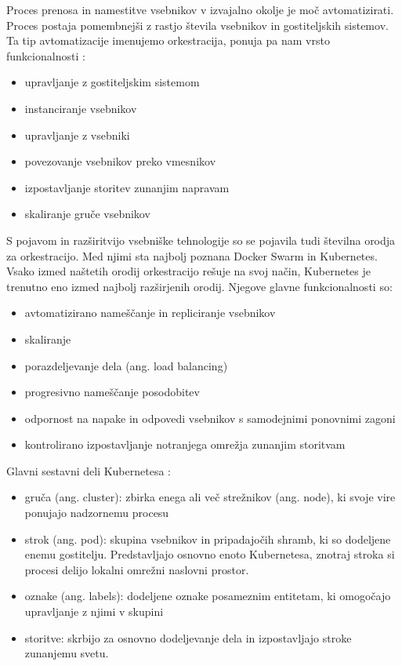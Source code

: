 \documentclass[a4paper, 12pt]{book}
\begin{document}
Proces prenosa in namestitve vsebnikov v izvajalno okolje je moč avtomatizirati.
Proces postaja pomembnejši z rastjo števila vsebnikov in gostiteljskih sistemov. 
Ta tip avtomatizacije imenujemo orkestracija, ponuja pa nam vrsto funkcionalnosti \cite{mongoKubernetes}:
\begin{itemize}
	\item upravljanje z gostiteljskim sistemom
	\item instanciranje vsebnikov
	\item upravljanje z vsebniki
	\item povezovanje vsebnikov preko vmesnikov
	\item izpostavljanje storitev zunanjim napravam
	\item skaliranje gruče vsebnikov
\end{itemize}

S pojavom in razširitvijo vsebniške tehnologije so se pojavila tudi številna orodja za orkestracijo.
Med njimi sta najbolj poznana Docker Swarm in Kubernetes.
Vsako izmed naštetih orodij orkestracijo rešuje na svoj način, Kubernetes je trenutno eno izmed najbolj razširjenih orodij.
Njegove glavne funkcionalnosti so:
\begin{itemize}
	\item avtomatizirano nameščanje in repliciranje vsebnikov
	\item skaliranje
	\item porazdeljevanje dela (ang. load balancing)
	\item progresivno nameščanje posodobitev
	\item odpornost na napake in odpovedi vsebnikov s samodejnimi ponovnimi zagoni
	\item kontrolirano izpostavljanje notranjega omrežja zunanjim storitvam
\end{itemize}

Glavni sestavni deli Kubernetesa \cite{mongoKubernetes}: 
\begin{itemize}
	\item gruča (ang. cluster): zbirka enega ali več strežnikov (ang. node), ki svoje vire ponujajo nadzornemu procesu
	\item strok (ang. pod): skupina vsebnikov in pripadajočih shramb, ki so dodeljene enemu gostitelju. Predstavljajo osnovno enoto Kubernetesa, znotraj stroka si procesi delijo lokalni omrežni naslovni prostor.
	\item oznake (ang. labels): dodeljene oznake posameznim entitetam, ki omogočajo upravljanje z njimi v skupini
	\item storitve: skrbijo za osnovno dodeljevanje dela in izpostavljajo stroke zunanjemu svetu.
\end{itemize}
\end{document}
